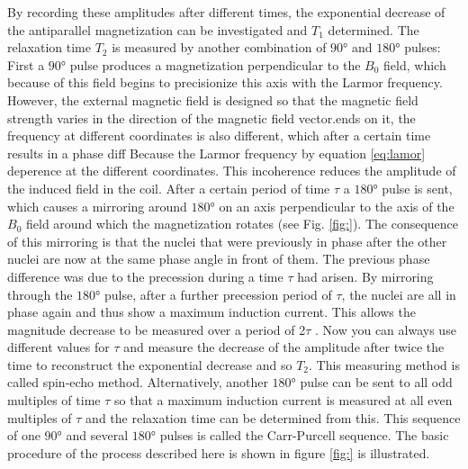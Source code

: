 By recording these amplitudes after different times, the exponential decrease of the antiparallel magnetization can be investigated and $T_1$ determined.
The relaxation time $T_2$ is measured by another combination of $\ang{90}$ and $\ang{180}$ pulses:
First a $\ang{90}$ pulse produces a magnetization perpendicular to the $B_0$ field, which because of this field begins to precisionize this axis with the Larmor frequency.
However, the external magnetic field is designed so that the magnetic field strength varies in the direction of the magnetic field vector.ends on it, the frequency at different coordinates is also different, which after a certain time results in a phase diff
Because the Larmor frequency by equation \ref{eq:lamor} deperence at the different coordinates.
This incoherence reduces the amplitude of the induced field in the coil.
After a certain period of time $\tau$ a $\ang{180}$ pulse is sent, which causes a mirroring around $\ang{180}$ on an axis perpendicular to the axis of the $B_0$ field around which the magnetization rotates (see Fig. \ref{fig:}).
The consequence of this mirroring is that the nuclei that were previously in phase after the other nuclei are now at the same phase angle in front of them. 
The previous phase difference was due to the precession during a time $\tau$ had arisen.
By mirroring through the $\ang{180}$ pulse, after a further precession period of $\tau$, the nuclei are all in phase again and thus show a maximum induction current.
This allows the magnitude decrease to be measured over a period of 2$\tau$ .
Now you can always use different values for $\tau$ and measure the decrease of the amplitude after twice the time to reconstruct the exponential decrease and so $T_2$.
This measuring method is called spin-echo method.
Alternatively, another $\ang{180}$ pulse can be sent to all odd multiples of time $\tau$ so that a maximum induction current is measured at all even multiples of $\tau$ and the relaxation time can be determined from this.
This sequence of one $\ang{90}$ and several $\ang{180}$ pulses is called the Carr-Purcell sequence.
The basic procedure of the process described here is shown in figure \ref{fig:} is illustrated.



